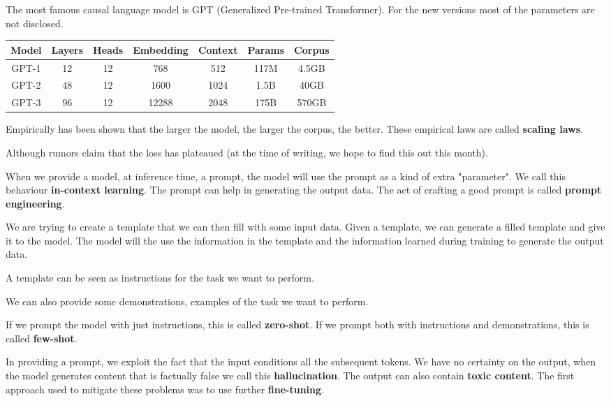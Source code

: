 The most famous causal language model is GPT (Generalized Pre-trained Transformer).
For the new versions most of the parameters are not disclosed.
\begin{tabular}{|c|c|c|c|c|c|c|}
    \hline
    Model & Layers & Heads & Embedding & Context & Params & Corpus \\
    \hline
    GPT-1 & 12 & 12 & 768 & 512 & 117M & 4.5GB \\
    GPT-2 & 48 & 12 & 1600 & 1024 & 1.5B & 40GB \\
    GPT-3 & 96 & 12 & 12288 & 2048 & 175B & 570GB \\
    \hline
    
\end{tabular}

Empirically has been shown that the larger the model, the larger the corpus, the better.
These empirical laws are called \textbf{scaling laws}.

Although rumors claim that the loss has plateaued (at the time of writing, we hope to find this out this month).

When we provide a model, at inference time, a prompt, the model will use the prompt as a kind of extra "parameter".
We call this behaviour \textbf{in-context learning}. The prompt can help in generating the output data.
The act of crafting a good prompt is called \textbf{prompt engineering}.

We are trying to create a template that we can then fill with some input data.
Given a template, we can generate a filled template and give it to the model.
The model will the use the information in the template and the information learned during training
to generate the output data.

A template can be seen as instructions for the task we want to perform.

We can also provide some demonstrations, examples of the task we want to perform.

If we prompt the model with just instructions, this is called \textbf{zero-shot}.
If we prompt both with instructions and demonstrations, this is called \textbf{few-shot}.

In providing a prompt, we exploit the fact that the input conditions all the subsequent tokens.
We have no certainty on the output, when the model generates content that is factually false
we call this \textbf{hallucination}.
The output can also contain \textbf{toxic content}.
The first approach used to mitigate these problems was to use further \textbf{fine-tuning}.

